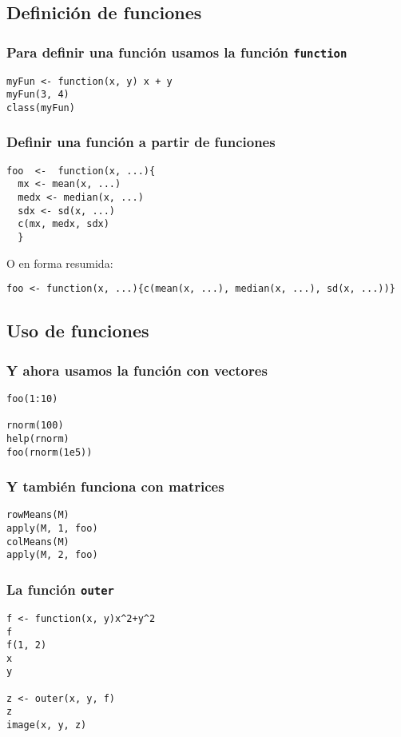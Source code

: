 \documentclass{beamer}
\begin{document}
\subsection{Definición de funciones}
\label{sec-2-1}
\begin{frame}[fragile]
\frametitle{Para definir una función usamos la función \texttt{function}}
\label{sec-2-1-1}


\lstset{language=R}
\begin{lstlisting}
myFun <- function(x, y) x + y
myFun(3, 4)
class(myFun)
\end{lstlisting}
\end{frame}
\begin{frame}[fragile]
\frametitle{Definir una función a partir de funciones}
\label{sec-2-1-2}


\lstset{language=R}
\begin{lstlisting}
foo  <-  function(x, ...){
  mx <- mean(x, ...)
  medx <- median(x, ...)
  sdx <- sd(x, ...)
  c(mx, medx, sdx)
  }
\end{lstlisting}
O en forma resumida:

\lstset{language=R}
\begin{lstlisting}
foo <- function(x, ...){c(mean(x, ...), median(x, ...), sd(x, ...))}
\end{lstlisting}
\end{frame}
\subsection{Uso de funciones}
\label{sec-2-2}
\begin{frame}[fragile]
\frametitle{Y ahora usamos la función con vectores}
\label{sec-2-2-1}


\lstset{language=R}
\begin{lstlisting}
foo(1:10)

rnorm(100)
help(rnorm)
foo(rnorm(1e5))
\end{lstlisting}
\end{frame}
\begin{frame}[fragile]
\frametitle{Y también funciona con matrices}
\label{sec-2-2-2}


\lstset{language=R}
\begin{lstlisting}
rowMeans(M)
apply(M, 1, foo)
colMeans(M)
apply(M, 2, foo)
\end{lstlisting}
\end{frame}
\begin{frame}[fragile]
\frametitle{La función \texttt{outer}}
\label{sec-2-2-3}


\lstset{language=R}
\begin{lstlisting}
f <- function(x, y)x^2+y^2
f
f(1, 2)
x
y

z <- outer(x, y, f)
z
image(x, y, z)
\end{lstlisting}
\end{frame}
\end{document}
